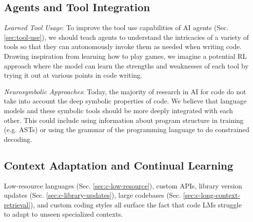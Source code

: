 \subsection{Agents and Tool Integration}
\textit{Learned Tool Usage}: To improve the tool use capabilities of AI agents (Sec. \ref{sec:tool-use}), we should teach agents to understand the intricacies of a variety of tools so that they can autonomously invoke them as needed when writing code. Drawing inspiration from learning how to play games, we imagine a potential RL approach where the model can learn the strengths and weaknesses of each tool by trying it out at various points in code writing.


\textit{Neurosymbolic Approaches}: Today, the majority of research in AI for code do not take into account the deep symbolic properties of code. We believe that language models and these symbolic tools should be more deeply integrated with each other. This could include using information about program structure in training (e.g. ASTs) or using the grammar of the programming language to do constrained decoding.





\subsection{Context Adaptation and Continual Learning}

Low-resource languages (Sec. \ref{sec:c-low-resource}), custom APIs, library version updates (Sec. \ref{sec:c-library-updates}), large codebases (Sec. \ref{sec:c-long-context-retrieval}), and custom coding styles all surface the fact that code LMs struggle to adapt to unseen specialized contexts. 

